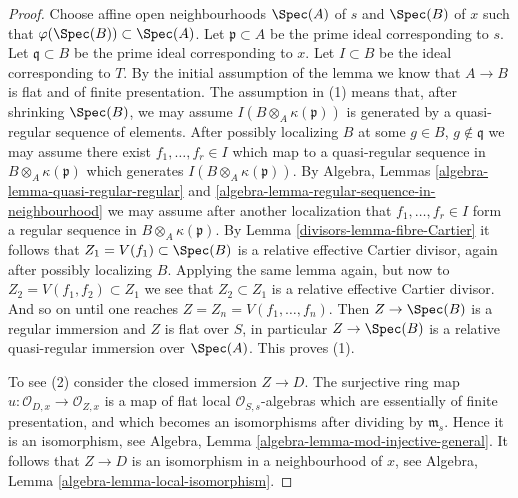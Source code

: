 \begin{proof}

Choose affine open neighbourhoods $\Spec(A)$ of $s$ and
$\Spec(B)$ of $x$ such that
$\varphi(\Spec(B)) \subset \Spec(A)$.
Let $\mathfrak p \subset A$ be the prime ideal corresponding to $s$.
Let $\mathfrak q \subset B$ be the prime ideal corresponding to $x$.
Let $I \subset B$ be the ideal corresponding to $T$.
By the initial assumption of the lemma we know that
$A \to B$ is flat and of finite presentation.
The assumption in (1) means that, after shrinking $\Spec(B)$, we may
assume $I(B \otimes_A \kappa(\mathfrak p))$ is generated by a
quasi-regular sequence of elements. After possibly localizing $B$
at some $g \in B$, $g \not \in \mathfrak q$ we may assume there
exist $f_1, \ldots, f_r \in I$ which map to a quasi-regular
sequence in $B \otimes_A \kappa(\mathfrak p)$ which generates
$I(B \otimes_A \kappa(\mathfrak p))$. By
Algebra, Lemmas \ref{algebra-lemma-quasi-regular-regular} and
\ref{algebra-lemma-regular-sequence-in-neighbourhood}
we may assume after another localization that
$f_1, \ldots, f_r \in I$ form a regular
sequence in $B \otimes_A \kappa(\mathfrak p)$. By
Lemma \ref{divisors-lemma-fibre-Cartier}
it follows that $Z_1 = V(f_1) \subset \Spec(B)$
is a relative effective Cartier divisor, again after possibly
localizing $B$. Applying the same lemma again, but now to
$Z_2 = V(f_1, f_2) \subset Z_1$ we see that $Z_2 \subset Z_1$
is a relative effective Cartier divisor. And so on until one
reaches $Z = Z_n = V(f_1, \ldots, f_n)$. Then
$Z \to \Spec(B)$ is a regular immersion and $Z$ is
flat over $S$, in particular $Z \to \Spec(B)$ is
a relative quasi-regular immersion over $\Spec(A)$.
This proves (1).

\medskip\noindent
To see (2) consider the closed immersion $Z \to D$. The surjective
ring map $u : \mathcal{O}_{D, x} \to \mathcal{O}_{Z, x}$
is a map of flat local $\mathcal{O}_{S, s}$-algebras which
are essentially of finite presentation, and which becomes an
isomorphisms after dividing by $\mathfrak m_s$. Hence it is
an isomorphism, see
Algebra, Lemma \ref{algebra-lemma-mod-injective-general}.
It follows that $Z \to D$ is an isomorphism in a neighbourhood
of $x$, see
Algebra, Lemma \ref{algebra-lemma-local-isomorphism}.


\end{proof}
